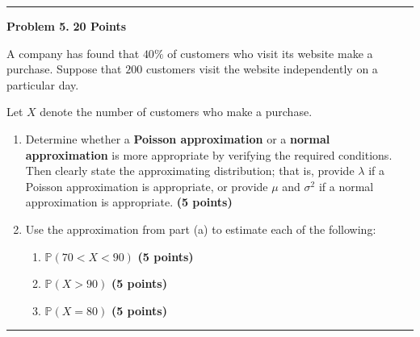 \documentclass[11pt]{article}
\begin{document}
\hrule

\newpage
 




\begin{problemheader}
\textbf{Problem 5.} \hfill \textbf{20 Points}
\end{problemheader}

A company has found that \(40\%\) of customers who visit its website make a purchase. Suppose that \(200\) customers visit the website independently on a particular day.

Let \(X\) denote the number of customers who make a purchase.

\begin{enumerate}[]

\item Determine whether a \textbf{Poisson approximation} or a
\textbf{normal approximation} is more appropriate by verifying the
required conditions. Then clearly state the approximating distribution;
that is, provide \(\lambda\) if a Poisson approximation is appropriate,
or provide \(\mu\) and \(\sigma^2\) if a normal approximation is
appropriate.   \hfill \textbf{(5 points)}

\item  Use the approximation from part (a) to estimate each of the following:
\begin{enumerate}[]
    \item  \(\mathbb{P}(70<X<90)\)  \hfill \textbf{(5 points)}
    \item  \(\mathbb{P}(X>90)\)  \hfill \textbf{(5 points)}
    \item  \(\mathbb{P}(X=80)\)  \hfill \textbf{(5 points)}
\end{enumerate}

\end{enumerate}

\hrule

  
\end{document}
